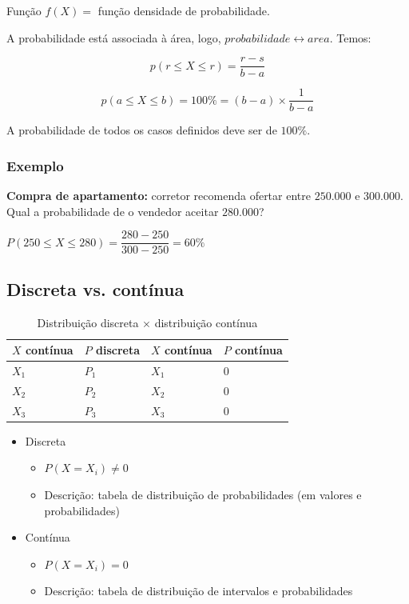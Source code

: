 \documentclass[a4paper]{article}
\begin{document}
	Função $f(X) =$ função densidade de probabilidade.
	
	A probabilidade está associada à área, logo, $probabilidade\leftrightarrow area$. Temos:
	
	\begin{equation*}
		p(r \leq X \leq r) = \dfrac{r - s}{b -a}
	\end{equation*}
	
	\begin{equation*}
		p(a \leq X \leq b) = 100\% = (b-a) \times \dfrac{1}{b-a}
	\end{equation*} 
	
	A probabilidade de todos os casos definidos deve ser de $100\%$.
	
	\subsubsection{Exemplo}
	
	\noindent \textbf{Compra de apartamento:} corretor recomenda ofertar entre $250.000$ e $300.000$. Qual a probabilidade de o vendedor aceitar $280.000$?
	
	$P(250 \leq X \leq 280) = \dfrac{280 - 250}{300 - 250} = 60\%$
	
	\subsection{Discreta vs. contínua}
	
	\begin{table}[h]
		\centering
		\caption{Distribuição discreta $\times$ distribuição contínua}
		\label{tab:pbinomialc}
		\begin{tabular}{l|l|l|l}
			\textbf{$X$ contínua} & \textbf{$P$ discreta} & \textbf{$X$ contínua} & \textbf{$P$ contínua} \\ \hline
			$X_1$ & $P_1$ & $X_1$ & $0$ \\
			$X_2$ & $P_2$ & $X_2$ & $0$ \\
			$X_3$ & $P_3$ & $X_3$ & $0$
		\end{tabular}
	\end{table}

	\begin{itemize}
		\item Discreta
		\begin{itemize}
			\item $P(X=X_i) \neq 0$
			\item Descrição: tabela de distribuição de probabilidades (em valores e probabilidades)
		\end{itemize}
		\item Contínua
		\begin{itemize}
			\item $P(X=X_i) = 0$
			\item Descrição: tabela de distribuição de intervalos e probabilidades
		\end{itemize}
	\end{itemize}
	
\end{document}
